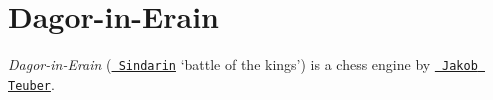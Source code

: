 \chapter{Dagor-\/in-\/\+Erain}
\hypertarget{index}{}\label{index}
\label{index_md_Readme}%
%


{\itshape Dagor-\/in-\/\+Erain} (\href{https://eldamo.org/content/words/word-4289554149.html}{\texttt{ Sindarin}} ‘battle of the kings’) is a chess engine by \href{https://github.com/j-teuber}{\texttt{ Jakob Teuber}}. 